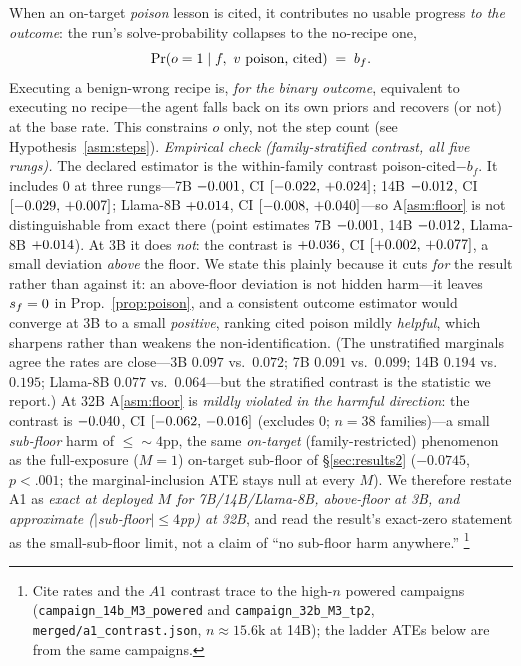 \begin{assumption}\label{asm:floor}
When an on-target \emph{poison} lesson is cited, it contributes no usable progress
\emph{to the outcome}: the run's solve-probability collapses to the no-recipe one,
\[
\Pr(o=1\mid f,\ v\text{ poison, cited}) \;=\; b_f .
\]
Executing a benign-wrong recipe is, \emph{for the binary outcome}, equivalent to
executing no recipe---the agent falls back on its own priors and recovers (or not) at
the base rate. This constrains $o$ only, not the step count (see
Hypothesis~\ref{asm:steps}). \emph{Empirical check (family-stratified contrast, all five
rungs).} The declared estimator is the within-family contrast poison-cited$-b_f$. It
includes $0$ at three rungs---7B $-0.001{}$, CI $[-0.022,\,+0.024]{}$; 14B
$-0.012{}$, CI $[-0.029,\,+0.007]{}$; Llama-8B $+0.014{}$, CI
$[-0.008,\,+0.040]{}$---so A\ref{asm:floor} is not distinguishable from exact there (point estimates 7B
$-0.001{}$, 14B $-0.012{}$, Llama-8B $+0.014{}$). At 3B it does \emph{not}:
the contrast is $+0.036{}$, CI $[+0.002,\,+0.077]{}$, a small deviation \emph{above}
the floor. We state this plainly because it cuts \emph{for} the result rather than
against it: an above-floor deviation is not hidden harm---it leaves $s_f=0$ in
Prop.~\ref{prop:poison}, and a consistent outcome estimator would converge at 3B to a
small \emph{positive}, ranking cited poison mildly \emph{helpful}, which sharpens rather
than weakens the non-identification. (The unstratified marginals agree the rates are
close---3B $0.097$ vs.\ $0.072$; 7B $0.091$ vs.\ $0.099$; 14B $0.194$ vs.\ $0.195$;
Llama-8B $0.077$ vs.\ $0.064$---but the stratified contrast is the statistic we
report.) At 32B A\ref{asm:floor} is \emph{mildly violated in the harmful direction}: the
contrast is $-0.040{}$, CI $[-0.062,\,-0.016]{}$ (excludes $0$; $n{=}38$
families)---a small \emph{sub-floor} harm of $\le{\sim}4$pp, the same \emph{on-target} (family-restricted) phenomenon as the
full-exposure ($M{=}1$) on-target sub-floor of \S\ref{sec:results2} ($-0.0745$, $p<.001$;
the marginal-inclusion ATE stays null at every $M$). We therefore restate A1 as \emph{exact at deployed
$M$ for 7B/14B/Llama-8B, above-floor at 3B, and approximate ($|$sub-floor$|\le4$pp) at
32B}, and read the result's exact-zero statement as the small-sub-floor limit, not a claim
of ``no sub-floor harm anywhere.''%
\footnote{Cite rates and the $A1$ contrast trace to the high-$n$ powered campaigns
(\texttt{campaign\_14b\_M3\_powered} and \texttt{campaign\_32b\_M3\_tp2}, \texttt{merged/a1\_contrast.json},
$n{\approx}15.6$k at 14B); the ladder ATEs below are from the same campaigns.}
\end{assumption}

